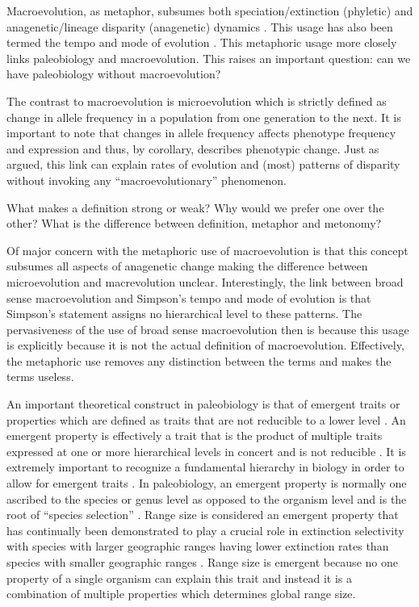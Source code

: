 \documentclass[12pt,letterpaper]{article}
\begin{document}
Macroevolution, as metaphor, subsumes both speciation/extinction (phyletic) and anagenetic/lineage disparity (anagenetic) dynamics \citep{Foote2007b}. This usage has also been termed the tempo and mode of evolution \citep{Simpson1944}. This metaphoric usage more closely links paleobiology and macroevolution. This raises an important question: can we have paleobiology without macroevolution?

The contrast to macroevolution is microevolution \citep{Simpson1944,Foote2007b} which is strictly defined as change in allele frequency in a population from one generation to the next. It is important to note that changes in allele frequency affects phenotype frequency and expression and thus, by corollary, describes phenotypic change. Just as \citet{Simpson1944} argued, this link can explain rates of evolution and (most) patterns of disparity without invoking any ``macroevolutionary'' phenomenon.

What makes a definition strong or weak? Why would we prefer one over the other? What is the difference between definition, metaphor and metonomy?

Of major concern with the metaphoric use of macroevolution is that this concept subsumes all aspects of anagenetic change making the difference between microevolution and macrevolution unclear. Interestingly, the link between broad sense macroevolution and Simpson's tempo and mode of evolution is that Simpson's statement assigns no hierarchical level to these patterns. The pervasiveness of the use of broad sense macroevolution then is because this usage is explicitly because it is not the actual definition of macroevolution. Effectively, the metaphoric use removes any distinction between the terms and makes the terms useless.

An important theoretical construct in paleobiology is that of emergent traits or properties which are defined as traits that are not reducible to a lower level \citep{Grantham1995,Vrba1984,Jablonski2008a,Lloyd1993}. An emergent property is effectively a trait that is the product of multiple traits expressed at one or more hierarchical levels in concert and is not reducible \citep{Vrba1984,Jablonski2008a}. It is extremely important to recognize a fundamental hierarchy in biology in order to allow for emergent traits \citep{Vrba1984}. In paleobiology, an emergent property is normally one ascribed to the species or genus level as opposed to the organism level and is the root of ``species selection'' \citep{Jablonski2008a,Vrba1984,Lloyd1993,Grantham1995}. Range size is considered an emergent property that has continually been demonstrated to play a crucial role in extinction selectivity with species with larger geographic ranges having lower extinction rates than species with smaller geographic ranges \citep{Jablonski1986,Harnik2013,Nurnberg2013a,Jablonski2003,Roy2009c}. Range size is emergent because no one property of a single organism can explain this trait and instead it is a combination of multiple properties which determines global range size.
\end{document}
